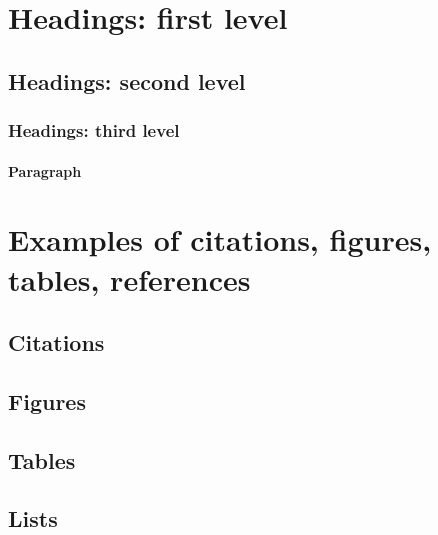 \documentclass{article}
\begin{document}
\section{Headings: first level}
\label{sec:headings}


\subsection{Headings: second level}


\subsubsection{Headings: third level}


\paragraph{Paragraph}


\section{Examples of citations, figures, tables, references}
\label{sec:others}

\subsection{Citations}


\subsection{Figures}


\subsection{Tables}


\subsection{Lists}




\end{document}
